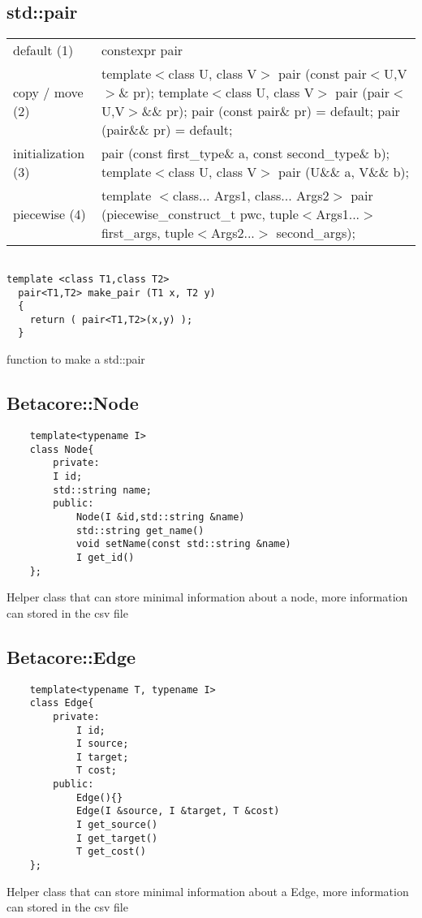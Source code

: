 \documentclass[12pt]{article}
\begin{document}
\subsection{std::pair}
\begin{tabular}{ p{5cm} p{10cm} }
default (1) & constexpr pair\\
copy / move (2) & template$<$class U, class V$>$ pair (const pair$<$U,V$>$\& pr);
					template$<$class U, class V$>$ pair (pair$<$U,V$>$\&\& pr);
					pair (const pair\& pr) = default;
					pair (pair\&\& pr) = default;\\
initialization (3) & pair (const first\_type\& a, const second\_type\& b);
					template$<$class U, class V$>$ pair (U\&\& a, V\&\& b);\\
piecewise (4) &		
					template $<$class... Args1, class... Args2$>$
  					pair (piecewise\_construct\_t pwc, tuple$<$Args1...$>$ first\_args,
                                   tuple$<$Args2...$>$ second\_args);
					
					
\end{tabular}
\begin{lstlisting}

template <class T1,class T2>
  pair<T1,T2> make_pair (T1 x, T2 y)
  {
    return ( pair<T1,T2>(x,y) );
  }
\end{lstlisting}
function to make a std::pair

\subsection{Betacore::Node}
\begin{lstlisting}
	template<typename I>
	class Node{
		private:
		I id;
		std::string name;
		public:
			Node(I &id,std::string &name)
			std::string get_name()
			void setName(const std::string &name)
			I get_id()
	};
\end{lstlisting}
Helper class that can store minimal information about a node, 
more information can stored in the csv file
\subsection{Betacore::Edge}
\begin{lstlisting}
	template<typename T, typename I>
	class Edge{
		private:
			I id;
			I source;
			I target;
			T cost;
		public:
			Edge(){}
			Edge(I &source, I &target, T &cost)
			I get_source()
			I get_target()
			T get_cost()
	};
\end{lstlisting}
Helper class that can store minimal information about a Edge, 
more information can stored in the csv file
\end{document}
